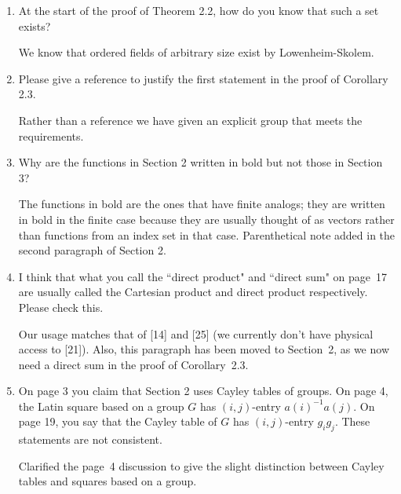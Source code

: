 \documentclass[12pt,a4paper]{article}
\newenvironment{QandA}{\begin{enumerate}[label=\bfseries\alph*.]\bfseries}
                      {\end{enumerate}}
\newenvironment{answered}{\par\normalfont}{}
\begin{document}
\begin{QandA}

\item At the start of the proof of Theorem 2.2, how do you know that such a set exists? 

\begin{answered}
We know that ordered fields of arbitrary size exist by Lowenheim-Skolem. 
\end{answered}

\item Please give a reference to justify the first statement in the proof of Corollary 2.3.

\begin{answered}
Rather than a reference we have given an explicit group that meets the requirements.
\end{answered}

\item Why are the functions in Section 2 written in bold but not those in Section 3?

\begin{answered}
The functions in bold are the ones that have finite analogs; they are written in bold in the finite case because they are usually thought of as vectors rather than functions from an index set in that case.  Parenthetical note added in the second paragraph of Section 2.
\end{answered}

\item I think that what you call the ``direct product" and ``direct sum" on page~17 are usually called the Cartesian product and direct product respectively. Please check this.

\begin{answered}
Our usage matches that of [14] and [25] (we currently don't have physical access to [21]).  Also, this paragraph has been moved to Section~2, as we now need a direct sum in the proof of Corollary~2.3.
\end{answered}


\item On page 3 you claim that Section 2 uses Cayley tables of groups. On page 4, the Latin square based on a group $G$ has $(i,j)$-entry $a(i)^{-1} a(j)$. On page 19, you say that the Cayley table of $G$ has $(i,j)$-entry $g_ig_j$. These statements are not consistent.

\begin{answered}
Clarified the page~4 discussion to give the slight distinction between Cayley tables and squares based on a group.  
\end{answered}



\end{QandA}
\end{document}
